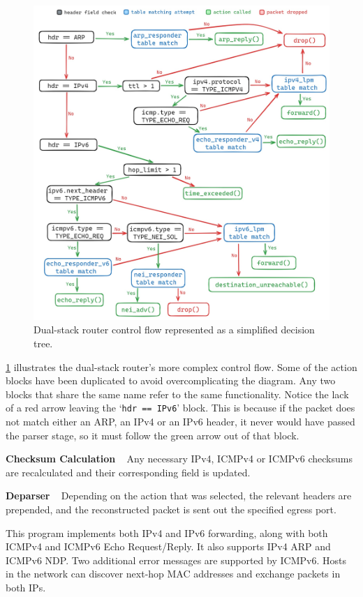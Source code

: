 \begin{figure}[htbp]
  \centering
    \includegraphics[width=1\textwidth]{figures/implementation/dualstack_apply.jpg}
     \caption{Dual-stack router control flow represented as a simplified decision tree.}
     \label{fig:impl-dualapply}
\end{figure}

\cref{fig:impl-dualapply} illustrates the dual-stack router's more complex control flow. Some of the action blocks have been duplicated to avoid overcomplicating the diagram. Any two blocks that share the same name refer to the same functionality. Notice the lack of a red arrow leaving the `\texttt{hdr == IPv6}' block. This is because if the packet does not match either an ARP, an IPv4 or an IPv6 header, it never would have passed the parser stage, so it must follow the green arrow out of that block.

\textbf{Checksum Calculation} ~ Any necessary IPv4, ICMPv4 or ICMPv6 checksums are recalculated and their corresponding field is updated.

\textbf{Deparser} ~ Depending on the action that was selected, the relevant headers are prepended, and the reconstructed packet is sent out the specified egress port.

This program implements both IPv4 and IPv6 forwarding, along with both ICMPv4 and ICMPv6 Echo Request/Reply. It also supports IPv4 ARP and ICMPv6 NDP. Two additional error messages are supported by ICMPv6. Hosts in the network can discover next-hop MAC addresses and exchange packets in both IPs.


